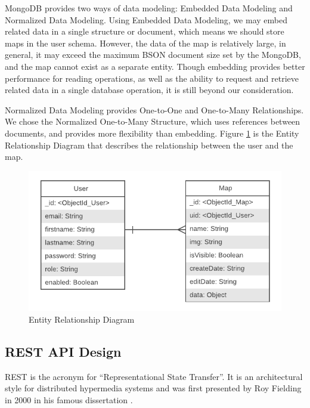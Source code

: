 MongoDB provides two ways of data modeling: Embedded Data Modeling and Normalized Data Modeling. Using Embedded Data Modeling, we may embed related data in a single structure or document, which means we should store maps in the user schema. However, the data of the map is relatively large, in general, it may exceed the maximum BSON document size set by the MongoDB, and the map cannot exist as a separate entity. Though embedding provides better performance for reading operations, as well as the ability to request and retrieve related data in a single database operation, it is still beyond our consideration.

Normalized Data Modeling provides One-to-One and One-to-Many Relationships. We chose the Normalized One-to-Many Structure, which uses references between documents, and provides more flexibility than embedding. Figure \ref{fig:ER Diagram} is the Entity Relationship Diagram that describes the relationship between the user and the map.

\begin{figure}[htbp]
\centering
\includegraphics[width=\textwidth]{section03/assets/ER_Diagram.png}
\caption[Entity Relationship Diagram]{\label{fig:ER Diagram}Entity Relationship Diagram}
\end{figure}

\subsection{REST API Design}
\label{sec:Design>REST API Design}
REST is the acronym for ``Representational State Transfer''. It is an architectural style for distributed hypermedia systems and was first presented by Roy Fielding in 2000 in his famous dissertation \cite{Fielding00architecturalstyles}.


